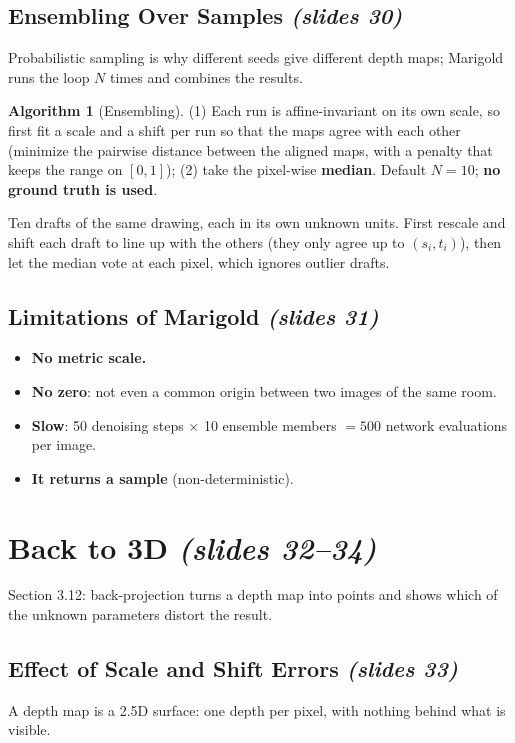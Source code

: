 \documentclass[11pt,a4paper]{article}
\newcommand{\slides}[1]{\texorpdfstring{\emph{(slides #1)}}{(slides #1)}}
\theoremstyle{plain}
\theoremstyle{definition}
\newtheorem{algorithm}[theorem]{Algorithm}
\numberwithin{equation}{section}
\begin{document}
\subsection{Ensembling Over Samples \slides{30}}
Probabilistic sampling is why different seeds give different depth maps; Marigold runs the loop $N$ times and combines the results.
\begin{algorithm}[Ensembling]
(1) Each run is affine-invariant on its own scale, so first fit a scale and a shift per run so that the maps agree with each other (minimize the pairwise distance between the aligned maps, with a penalty that keeps the range on $[0,1]$); (2) take the pixel-wise \textbf{median}. Default $N=10$; \textbf{no ground truth is used}.
\end{algorithm}
\begin{intuition}
Ten drafts of the same drawing, each in its own unknown units. First rescale and shift each draft to line up with the others (they only agree up to $(s_i,t_i)$), then let the median vote at each pixel, which ignores outlier drafts.
\end{intuition}

\subsection{Limitations of Marigold \slides{31}}
\begin{itemize}[nosep]
 \item \textbf{No metric scale.}
 \item \textbf{No zero}: not even a common origin between two images of the same room.
 \item \textbf{Slow}: 50 denoising steps $\times$ 10 ensemble members $=500$ network evaluations per image.
 \item \textbf{It returns a sample} (non-deterministic).
\end{itemize}

\section{Back to 3D \slides{32--34}}
Section 3.12: back-projection turns a depth map into points and shows which of the unknown parameters distort the result.

\subsection{Effect of Scale and Shift Errors \slides{33}}
A depth map is a 2.5D surface: one depth per pixel, with nothing behind what is visible.
\end{document}
